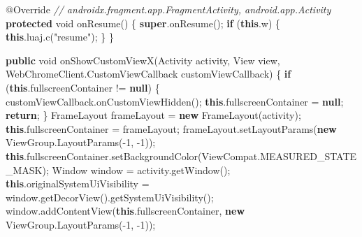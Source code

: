 \documentclass[
]{article}
\newenvironment{Shaded}{}{}
\newcommand{\AttributeTok}[1]{\textcolor[rgb]{0.49,0.56,0.16}{#1}}
\newcommand{\BuiltInTok}[1]{\textcolor[rgb]{0.00,0.50,0.00}{#1}}
\newcommand{\CommentTok}[1]{\textcolor[rgb]{0.38,0.63,0.69}{\textit{#1}}}
\newcommand{\ControlFlowTok}[1]{\textcolor[rgb]{0.00,0.44,0.13}{\textbf{#1}}}
\newcommand{\DataTypeTok}[1]{\textcolor[rgb]{0.56,0.13,0.00}{#1}}
\newcommand{\DecValTok}[1]{\textcolor[rgb]{0.25,0.63,0.44}{#1}}
\newcommand{\FunctionTok}[1]{\textcolor[rgb]{0.02,0.16,0.49}{#1}}
\newcommand{\KeywordTok}[1]{\textcolor[rgb]{0.00,0.44,0.13}{\textbf{#1}}}
\newcommand{\NormalTok}[1]{#1}
\newcommand{\OperatorTok}[1]{\textcolor[rgb]{0.40,0.40,0.40}{#1}}
\newcommand{\StringTok}[1]{\textcolor[rgb]{0.25,0.44,0.63}{#1}}
\begin{document}
\begin{Shaded}
\begin{Highlighting}[]
    \AttributeTok{@Override} \CommentTok{// androidx.fragment.app.FragmentActivity, android.app.Activity}
    \KeywordTok{protected} \DataTypeTok{void} \FunctionTok{onResume}\OperatorTok{()} \OperatorTok{\{}
        \KeywordTok{super}\OperatorTok{.}\FunctionTok{onResume}\OperatorTok{();}
        \ControlFlowTok{if} \OperatorTok{(}\KeywordTok{this}\OperatorTok{.}\FunctionTok{w}\OperatorTok{)} \OperatorTok{\{}
            \KeywordTok{this}\OperatorTok{.}\FunctionTok{luaj}\OperatorTok{.}\FunctionTok{c}\OperatorTok{(}\StringTok{"resume"}\OperatorTok{);}
        \OperatorTok{\}}
    \OperatorTok{\}}

    \KeywordTok{public} \DataTypeTok{void} \FunctionTok{onShowCustomViewX}\OperatorTok{(}\NormalTok{Activity activity}\OperatorTok{,} \BuiltInTok{View}\NormalTok{ view}\OperatorTok{,}\NormalTok{ WebChromeClient}\OperatorTok{.}\FunctionTok{CustomViewCallback}\NormalTok{ customViewCallback}\OperatorTok{)} \OperatorTok{\{}
        \ControlFlowTok{if} \OperatorTok{(}\KeywordTok{this}\OperatorTok{.}\FunctionTok{fullscreenContainer} \OperatorTok{!=} \KeywordTok{null}\OperatorTok{)} \OperatorTok{\{}
\NormalTok{            customViewCallback}\OperatorTok{.}\FunctionTok{onCustomViewHidden}\OperatorTok{();}
            \KeywordTok{this}\OperatorTok{.}\FunctionTok{fullscreenContainer} \OperatorTok{=} \KeywordTok{null}\OperatorTok{;}
            \ControlFlowTok{return}\OperatorTok{;}
        \OperatorTok{\}}
\NormalTok{        FrameLayout frameLayout }\OperatorTok{=} \KeywordTok{new} \FunctionTok{FrameLayout}\OperatorTok{(}\NormalTok{activity}\OperatorTok{);}
        \KeywordTok{this}\OperatorTok{.}\FunctionTok{fullscreenContainer} \OperatorTok{=}\NormalTok{ frameLayout}\OperatorTok{;}
\NormalTok{        frameLayout}\OperatorTok{.}\FunctionTok{setLayoutParams}\OperatorTok{(}\KeywordTok{new}\NormalTok{ ViewGroup}\OperatorTok{.}\FunctionTok{LayoutParams}\OperatorTok{({-}}\DecValTok{1}\OperatorTok{,} \OperatorTok{{-}}\DecValTok{1}\OperatorTok{));}
        \KeywordTok{this}\OperatorTok{.}\FunctionTok{fullscreenContainer}\OperatorTok{.}\FunctionTok{setBackgroundColor}\OperatorTok{(}\NormalTok{ViewCompat}\OperatorTok{.}\FunctionTok{MEASURED\_STATE\_MASK}\OperatorTok{);}
        \BuiltInTok{Window}\NormalTok{ window }\OperatorTok{=}\NormalTok{ activity}\OperatorTok{.}\FunctionTok{getWindow}\OperatorTok{();}
        \KeywordTok{this}\OperatorTok{.}\FunctionTok{originalSystemUiVisibility} \OperatorTok{=}\NormalTok{ window}\OperatorTok{.}\FunctionTok{getDecorView}\OperatorTok{().}\FunctionTok{getSystemUiVisibility}\OperatorTok{();}
\NormalTok{        window}\OperatorTok{.}\FunctionTok{addContentView}\OperatorTok{(}\KeywordTok{this}\OperatorTok{.}\FunctionTok{fullscreenContainer}\OperatorTok{,} \KeywordTok{new}\NormalTok{ ViewGroup}\OperatorTok{.}\FunctionTok{LayoutParams}\OperatorTok{({-}}\DecValTok{1}\OperatorTok{,} \OperatorTok{{-}}\DecValTok{1}\OperatorTok{));}

\end{Highlighting}
\end{Shaded}
\end{document}
